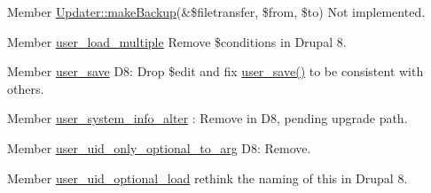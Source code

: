 \begin{DoxyDescription}
\item[Member \hyperlink{classUpdater_afdbf28100a8d3ed78cb97095fa221923}{Updater::makeBackup}(\&\$filetransfer, \$from, \$to) ]Not implemented. 
\end{DoxyDescription}

\label{todo__todo000023}
\hypertarget{todo__todo000023}{}
 
\begin{DoxyDescription}
\item[Member \hyperlink{user_8module_a9f73ad4a543faed0e38e8ea170bff32e}{user\_\-load\_\-multiple} ]Remove \$conditions in Drupal 8. 
\end{DoxyDescription}

\label{todo__todo000024}
\hypertarget{todo__todo000024}{}
 
\begin{DoxyDescription}
\item[Member \hyperlink{user_8module_a857b652072abb243e0b44b02c3746a99}{user\_\-save} ]D8: Drop \$edit and fix \hyperlink{user_8module_a857b652072abb243e0b44b02c3746a99}{user\_\-save()} to be consistent with others. 
\end{DoxyDescription}

\label{todo__todo000028}
\hypertarget{todo__todo000028}{}
 
\begin{DoxyDescription}
\item[Member \hyperlink{user_8module_a4fc928f2162969ae4331773ff226e3ec}{user\_\-system\_\-info\_\-alter} ]: Remove in D8, pending upgrade path. 
\end{DoxyDescription}

\label{todo__todo000025}
\hypertarget{todo__todo000025}{}
 
\begin{DoxyDescription}
\item[Member \hyperlink{user_8module_acafbef09764866dee15f8cf2b184aafc}{user\_\-uid\_\-only\_\-optional\_\-to\_\-arg} ]D8: Remove. 
\end{DoxyDescription}

\label{todo__todo000026}
\hypertarget{todo__todo000026}{}
 
\begin{DoxyDescription}
\item[Member \hyperlink{user_8module_adcdb22ab09fce9b389fb10ac76e13b07}{user\_\-uid\_\-optional\_\-load} ]rethink the naming of this in Drupal 8. 
\end{DoxyDescription}

